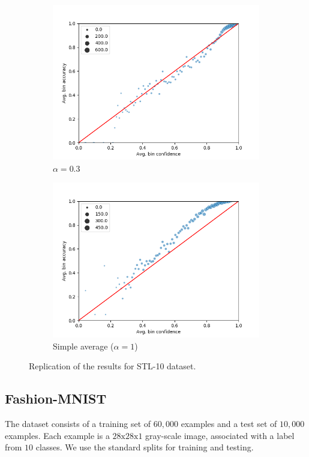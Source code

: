 \documentclass{article}
\begin{document}
\begin{figure}[h]
\begin{subfigure}[b]{0.31\textwidth}
         \centering
         \noindent\includegraphics[width=\textwidth]{images/stl10/scatterplot_0-3.png}
         \caption{$\alpha=0.3$}
     \end{subfigure}
     \begin{subfigure}[b]{0.31\textwidth}
         \centering
         \noindent\includegraphics[width=\textwidth]{images/stl10/scatterplot_1.png}
         \caption{Simple average ($\alpha=1$)}
     \end{subfigure}
        \caption{Replication of the results for STL-10 dataset.}
        \label{fig:stl_10}
\end{figure}

\subsection{Fashion-MNIST}
The dataset consists of a training set of $60,000$ examples and a test set of $10,000$ examples. Each example is a $28\text{x}28\text{x}1$ gray-scale image, associated with a label from $10$ classes. We use the standard splits for training and testing. 
\end{document}
